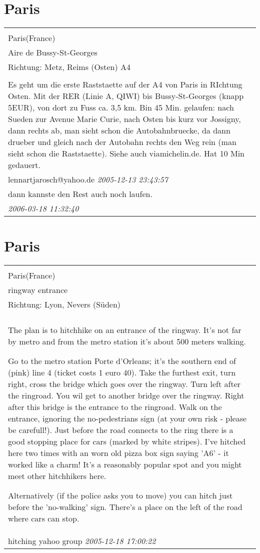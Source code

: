 \documentclass[a4paper,12pt]{article}
\begin{document}
\section{Paris}
\begin{tabular}{|p{13cm}|}
\hline\\
Paris(France)\\
Aire de Bussy-St-Georges\\
Richtung: Metz, Reims (Osten) A4 \\
\hline\\
Es geht um die erste Raststaette auf der A4 von Paris in RIchtung Osten. Mit der RER (Linie A, QIWI) bis Bussy-St-Georges (knapp 5EUR), von dort zu Fuss ca. 3,5 km. Bin 45 Min. gelaufen: nach Sueden zur Avenue Marie Curie, nach Osten bis kurz vor Jossigny, dann rechts ab, man sieht schon die Autobahnbruecke, da dann drueber und gleich nach der Autobahn rechts den Weg rein (man sieht schon die Raststaette). Siehe auch viamichelin.de. Hat 10 Min gedauert. \\
lennartjarosch@yahoo.de \textit{ 2005-12-13 23:43:57 }\\\hline dann kannste den Rest auch noch laufen. \\
\textit{ 2006-03-18 11:32:40 }\\\hline
\end{tabular}


\section{Paris}
\begin{tabular}{|p{13cm}|}
\hline\\
Paris(France)\\
ringway entrance\\
Richtung: Lyon, Nevers (Süden) \\
\hline\\
The plan is to hitchhike on an entrance of the ringway. It's not far by metro and from the metro station it's about 500 meters walking.

Go to the metro station Porte d'Orleans; it's the southern end of (pink) line 4 (ticket costs 1 euro 40). Take the furthest exit, turn right, cross the bridge which goes over the ringway. Turn left after the ringroad. You wil get to another bridge over the ringway. Right after this bridge is the entrance to the ringroad. Walk on the entrance, ignoring the no-pedestrians sign (at your own risk - please
be carefull!). Just before the road connects to the ring there is a good stopping place for cars (marked by white stripes). I've hitched here two times with an worn old pizza box sign saying 'A6' - it worked like a charm! It's a reasonably popular spot and you might meet other hitchhikers here.

Alternatively (if the police asks you to move) you can hitch just before the 'no-walking' sign. There's a place on the left of the road where cars can stop. \\
hitching yahoo group \textit{ 2005-12-18 17:00:22 }\\\hline
\end{tabular}
\end{document}
